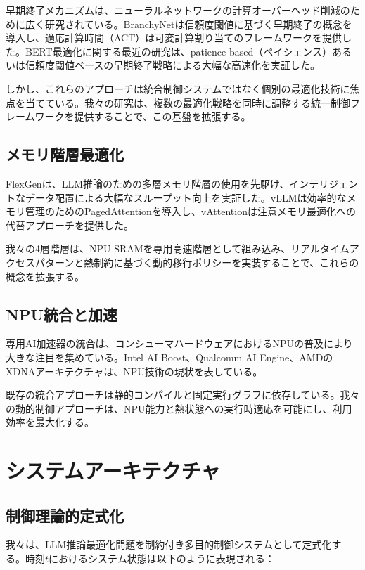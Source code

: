 \documentclass[10pt,twocolumn,a4paper]{jarticle}
\begin{document}
早期終了メカニズムは、ニューラルネットワークの計算オーバーヘッド削減のために広く研究されている。BranchyNetは信頼度閾値に基づく早期終了の概念を導入し、適応計算時間（ACT）は可変計算割り当てのフレームワークを提供した。BERT最適化に関する最近の研究は、patience-based（ペイシェンス）あるいは信頼度閾値ベースの早期終了戦略による大幅な高速化を実証した。

しかし、これらのアプローチは統合制御システムではなく個別の最適化技術に焦点を当てている。我々の研究は、複数の最適化戦略を同時に調整する統一制御フレームワークを提供することで、この基盤を拡張する。

\subsection{メモリ階層最適化}

FlexGenは、LLM推論のための多層メモリ階層の使用を先駆け、インテリジェントなデータ配置による大幅なスループット向上を実証した。vLLMは効率的なメモリ管理のためのPagedAttentionを導入し、vAttentionは注意メモリ最適化への代替アプローチを提供した。

我々の4層階層は、NPU SRAMを専用高速階層として組み込み、リアルタイムアクセスパターンと熱制約に基づく動的移行ポリシーを実装することで、これらの概念を拡張する。

\subsection{NPU統合と加速}

専用AI加速器の統合は、コンシューマハードウェアにおけるNPUの普及により大きな注目を集めている。Intel AI Boost、Qualcomm AI Engine、AMDのXDNAアーキテクチャは、NPU技術の現状を表している。

既存の統合アプローチは静的コンパイルと固定実行グラフに依存している。我々の動的制御アプローチは、NPU能力と熱状態への実行時適応を可能にし、利用効率を最大化する。

\section{システムアーキテクチャ}

\subsection{制御理論的定式化}

我々は、LLM推論最適化問題を制約付き多目的制御システムとして定式化する。時刻$t$におけるシステム状態は以下のように表現される：
\end{document}
